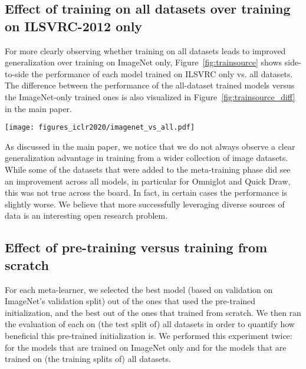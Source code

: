 \documentclass{article} \usepackage{iclr2020_conference,times}
\begin{document}
\subsection{Effect of training on all datasets over training on ILSVRC-2012 only}
\label{sec:appendix_trainsource}

For more clearly observing whether training on all datasets leads to improved
generalization over training on ImageNet only, Figure~\ref{fig:trainsource}
shows side-to-side the performance of each model trained on ILSVRC only vs. all datasets.
The difference between the performance of the all-dataset trained models versus the ImageNet-only trained ones is also visualized in Figure~\ref{fig:trainsource_diff} in the main paper.

\begin{figure*}[htp]
	\caption{Accuracy on the test datasets, when training on ILSVRC only or All datasets (same results as shown in the main tables). The bars display 95\% confidence intervals.}
  \label{fig:trainsource}
    \texttt{[image: figures\_iclr2020/imagenet\_vs\_all.pdf]}
\end{figure*}

As discussed in the main paper, we notice that we do not always observe a clear generalization advantage in training from a 
wider collection of image datasets. While some of the
datasets that were added to the meta-training phase did see an improvement
across all models, in particular for Omniglot and Quick Draw, this was not true
across the board. In fact, in certain cases the performance is slightly worse. We believe
that more successfully leveraging diverse sources of data is an interesting
open research problem.

\subsection{Effect of pre-training versus training from scratch}
For each meta-learner, we selected the best model (based on validation on ImageNet's validation split) out of the ones that used the pre-trained initialization, and the best out of the ones that trained from scratch. We then ran the evaluation of each on (the test split of) all datasets in order to quantify how beneficial this pre-trained initialization is. We performed this experiment twice: for the models that are trained on ImageNet only and for the models that are trained on (the training splits of) all datasets. 
\end{document}
